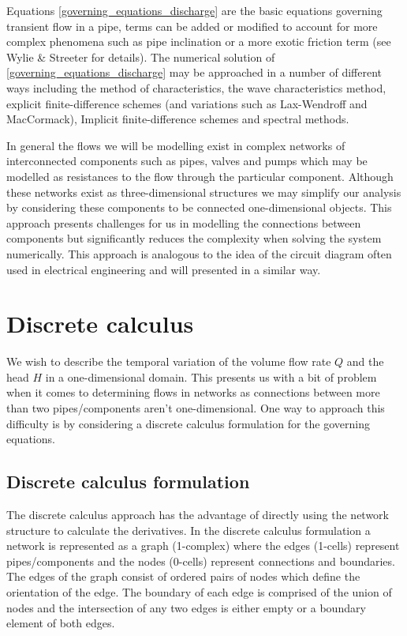 \documentclass[12pt]{article}
\begin{document}
Equations \eqref{governing_equations_discharge} are the basic equations governing transient flow in a pipe, terms can be added or modified to account for more complex phenomena such as pipe inclination or a more exotic friction term (see Wylie \& Streeter for details\cite{streeter78}). The numerical solution of \eqref{governing_equations_discharge} may be approached in a number of different ways including the method of characteristics, the wave characteristics method, explicit finite-difference schemes (and variations such as Lax-Wendroff and MacCormack), Implicit finite-difference schemes and spectral methods. 

In general the flows we will be modelling exist in complex networks of interconnected components such as pipes, valves and pumps which may be modelled as resistances to the flow through the particular component. Although these networks exist as three-dimensional structures we may simplify our analysis by considering these components to be connected one-dimensional objects. This approach presents challenges for us in modelling the connections between components but significantly reduces the complexity when solving the system numerically. This approach is analogous to the idea of the circuit diagram often used in electrical engineering and will presented in a similar way.  
 

\section{Discrete calculus} \label{sec:discrete_calculus}

We wish to describe the temporal variation of the volume flow rate $Q$ and the head $H$ in a one-dimensional domain. This presents us with a bit of problem when it comes to determining flows in networks as connections between more than two pipes/components aren't one-dimensional. One way to approach this difficulty is by considering a discrete calculus \cite{grady10} formulation for the governing equations.

\subsection{Discrete calculus formulation}\label{subsec:discrete_calculus_steady}

The discrete calculus approach has the advantage of directly using the network structure to calculate the derivatives. In the discrete calculus formulation a network is represented as a graph (1-complex) where the edges (1-cells) represent pipes/components and the nodes (0-cells) represent connections and boundaries. The edges of the graph consist of ordered pairs of nodes which define the orientation of the edge. The boundary of each edge is comprised of the union of nodes and the intersection of any two edges is either empty or a boundary element of both edges. 
\end{document}
